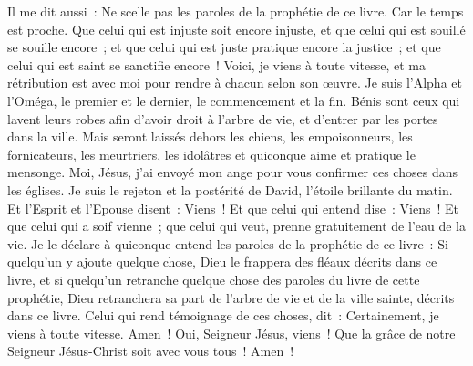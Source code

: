 \begin{multicols}{2}
Il me dit aussi~: Ne scelle pas les paroles de la prophétie de ce livre. Car le temps est proche.
Que celui qui est injuste soit encore injuste, et que celui qui est souillé se souille encore~; et que celui qui est juste pratique encore la justice~; et que celui qui est saint se sanctifie encore~!
Voici, je viens à toute vitesse, et ma rétribution est avec moi pour rendre à chacun selon son œuvre.
Je suis l'Alpha et l'Oméga, le premier et le dernier, le commencement et la fin.
Bénis sont ceux qui lavent leurs robes afin d'avoir droit à l'arbre de vie, et d'entrer par les portes dans la ville.
Mais seront laissés dehors les chiens, les empoisonneurs, les fornicateurs, les meurtriers, les idolâtres et quiconque aime et pratique le mensonge.
Moi, Jésus, j'ai envoyé mon ange pour vous confirmer ces choses dans les églises. Je suis le rejeton et la postérité de David, l'étoile brillante du matin.
Et l'Esprit et l'Epouse disent~: Viens~! Et que celui qui entend dise~: Viens~! Et que celui qui a soif vienne~; que celui qui veut, prenne gratuitement de l'eau de la vie.
Je le déclare à quiconque entend les paroles de la prophétie de ce livre~: Si quelqu'un y ajoute quelque chose, Dieu le frappera des fléaux décrits dans ce livre,
et si quelqu'un retranche quelque chose des paroles du livre de cette prophétie, Dieu retranchera sa part de l'arbre de vie et de la ville sainte, décrits dans ce livre.
Celui qui rend témoignage de ces choses, dit~: Certainement, je viens à toute vitesse. Amen~! Oui, Seigneur Jésus, viens~!
Que la grâce de notre Seigneur Jésus-Christ soit avec vous tous~! Amen~!
\PPE{}
\end{multicols}
